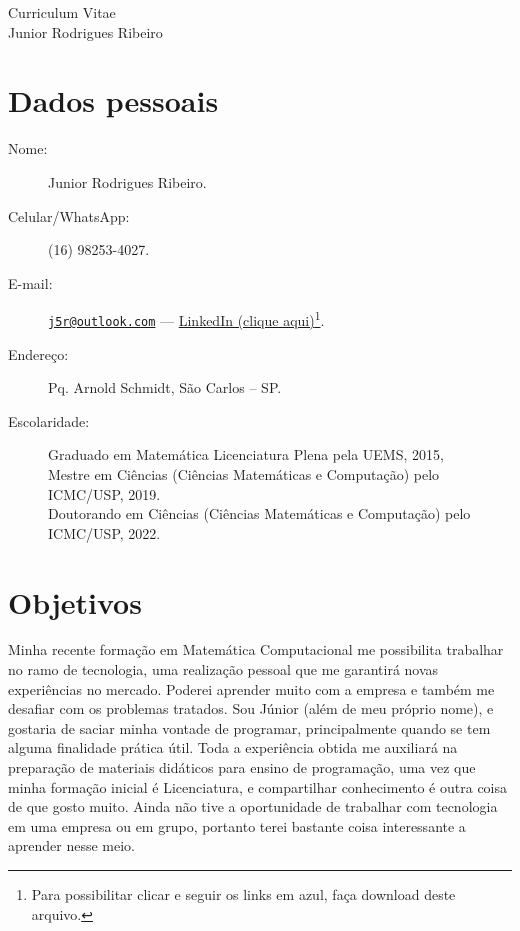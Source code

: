 \documentclass[11pt]{article}
\begin{document}
\begin{center}
\huge \sc Curriculum Vitae\\
\Large \sc Junior Rodrigues Ribeiro
\end{center}

\begin{flushright}
\end{flushright}
\vspace*{-4.4cm}

\section{Dados pessoais\dotfill  \hspace{3.4cm}\ }
\begin{description}
\item[Nome:] Junior Rodrigues Ribeiro.
\item[Celular/WhatsApp:] (16) 98253-4027.
\item[E-mail:] \href{mailto:j5r@outlook.com}{\nolinkurl{j5r@outlook.com}} --- \href{https://www.linkedin.com/in/junior-r-ribeiro-1b3378109}{LinkedIn (clique aqui)}\footnote{Para possibilitar clicar e seguir os links em azul, faça download deste arquivo.}.
\item[Endereço:] Pq. Arnold Schmidt, São Carlos -- SP.
\item[Escolaridade:] Graduado em Matemática Licenciatura Plena pela UEMS, 2015,\\
\phantom{Escolarid} Mestre em Ciências (Ciências Matemáticas e Computação) pelo ICMC/USP, 2019.\\
\phantom{Escolarid} Doutorando em Ciências (Ciências Matemáticas e Computação) pelo ICMC/USP, 2022.
\end{description}

\section{Objetivos \dotfill}
Minha recente formação em Matemática Computacional me possibilita trabalhar no ramo de tecnologia, uma realização pessoal  que me garantirá novas experiências no mercado. Poderei aprender muito com a empresa e também me desafiar com os problemas tratados. Sou Júnior (além de meu próprio nome), e gostaria de saciar minha vontade de programar,  principalmente quando se tem alguma finalidade prática útil. Toda a experiência obtida me auxiliará na preparação de materiais didáticos para ensino de programação, uma vez que minha formação inicial é Licenciatura, e compartilhar conhecimento é outra coisa de que gosto muito. Ainda não tive a oportunidade de trabalhar com tecnologia em uma empresa ou em grupo, portanto terei bastante coisa interessante a aprender nesse meio.
 
\end{document}
